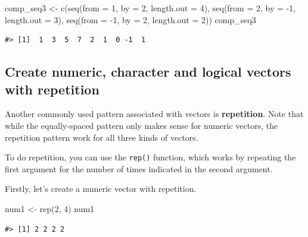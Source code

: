 \documentclass[
]{book}
\newenvironment{Shaded}{\begin{snugshade}}{\end{snugshade}}
\newcommand{\AttributeTok}[1]{\textcolor[rgb]{0.77,0.63,0.00}{#1}}
\newcommand{\DecValTok}[1]{\textcolor[rgb]{0.00,0.00,0.81}{#1}}
\newcommand{\FunctionTok}[1]{\textcolor[rgb]{0.00,0.00,0.00}{#1}}
\newcommand{\NormalTok}[1]{#1}
\newcommand{\OtherTok}[1]{\textcolor[rgb]{0.56,0.35,0.01}{#1}}
\newcommand{\SpecialCharTok}[1]{\textcolor[rgb]{0.00,0.00,0.00}{#1}}
\begin{document}
\begin{Shaded}
\begin{Highlighting}[]
\NormalTok{comp\_seq3 }\OtherTok{\textless{}{-}} \FunctionTok{c}\NormalTok{(}\FunctionTok{seq}\NormalTok{(}\AttributeTok{from =} \DecValTok{1}\NormalTok{,  }\AttributeTok{by =}  \DecValTok{2}\NormalTok{, }\AttributeTok{length.out =} \DecValTok{4}\NormalTok{),}
               \FunctionTok{seq}\NormalTok{(}\AttributeTok{from =} \DecValTok{2}\NormalTok{,  }\AttributeTok{by =} \SpecialCharTok{{-}}\DecValTok{1}\NormalTok{, }\AttributeTok{length.out =} \DecValTok{3}\NormalTok{),}
               \FunctionTok{seq}\NormalTok{(}\AttributeTok{from =} \SpecialCharTok{{-}}\DecValTok{1}\NormalTok{, }\AttributeTok{by =}  \DecValTok{2}\NormalTok{, }\AttributeTok{length.out =} \DecValTok{2}\NormalTok{))}
\NormalTok{comp\_seq3}
\end{Highlighting}
\end{Shaded}

\begin{verbatim}
#> [1]  1  3  5  7  2  1  0 -1  1
\end{verbatim}

\hypertarget{create-numeric-character-and-logical-vectors-with-repetition}{%
\subsection{Create numeric, character and logical vectors with repetition}\label{create-numeric-character-and-logical-vectors-with-repetition}}

Another commonly used pattern associated with vectors is \textbf{repetition}. Note that while the equally-spaced pattern only makes sense for numeric vectors, the repetition pattern work for all three kinds of vectors.

To do repetition, you can use the \texttt{rep()} function, which works by repeating the first argument for the number of times indicated in the second argument.

Firstly, let's create a numeric vector with repetition.

\begin{Shaded}
\begin{Highlighting}[]
\NormalTok{num1 }\OtherTok{\textless{}{-}} \FunctionTok{rep}\NormalTok{(}\DecValTok{2}\NormalTok{, }\DecValTok{4}\NormalTok{)}
\NormalTok{num1}
\end{Highlighting}
\end{Shaded}

\begin{verbatim}
#> [1] 2 2 2 2
\end{verbatim}
\end{document}
